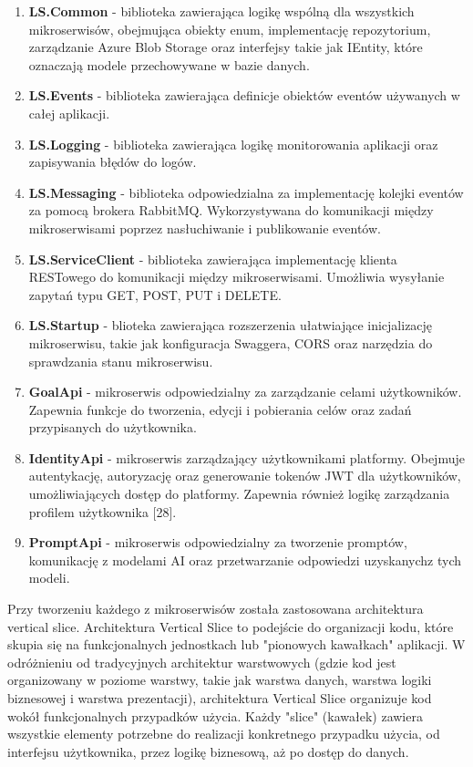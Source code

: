 \begin{enumerate}
\item {\bf LS.Common} - biblioteka zawierająca logikę wspólną dla wszystkich mikroserwisów, obejmująca obiekty enum, implementację repozytorium, zarządzanie Azure Blob Storage oraz interfejsy takie jak IEntity, które oznaczają modele przechowywane w bazie danych.
\item {\bf LS.Events} - biblioteka zawierająca definicje obiektów eventów używanych w całej aplikacji.
\item {\bf LS.Logging} - biblioteka zawierająca logikę monitorowania aplikacji oraz zapisywania błędów do logów.
\item {\bf LS.Messaging} - biblioteka odpowiedzialna za implementację kolejki eventów za pomocą brokera RabbitMQ. Wykorzystywana do komunikacji między mikroserwisami poprzez nasłuchiwanie i publikowanie eventów.
\item {\bf LS.ServiceClient} - biblioteka zawierająca implementację klienta RESTowego do komunikacji między mikroserwisami. Umożliwia wysyłanie zapytań typu GET, POST, PUT i DELETE.
\item {\bf LS.Startup} - blioteka zawierająca rozszerzenia ułatwiające inicjalizację mikroserwisu, takie jak konfiguracja Swaggera, CORS oraz narzędzia do sprawdzania stanu mikroserwisu.
\item {\bf GoalApi} - mikroserwis odpowiedzialny za zarządzanie celami użytkowników. Zapewnia funkcje do tworzenia, edycji i pobierania celów oraz zadań przypisanych do użytkownika.
\item {\bf IdentityApi} - mikroserwis zarządzający użytkownikami platformy. Obejmuje autentykację, autoryzację oraz generowanie tokenów JWT dla użytkowników, umożliwiających dostęp do platformy. Zapewnia również logikę zarządzania profilem użytkownika [28].
\item {\bf PromptApi} - mikroserwis odpowiedzialny za tworzenie promptów, komunikację z modelami AI oraz przetwarzanie odpowiedzi uzyskanych\linebreak z tych modeli.
\end{enumerate}

Przy tworzeniu każdego z mikroserwisów została zastosowana architektura vertical slice. Architektura Vertical Slice to podejście do organizacji kodu, które skupia się na funkcjonalnych jednostkach lub "pionowych kawałkach" aplikacji. W odróżnieniu od tradycyjnych architektur warstwowych (gdzie kod jest organizowany w poziome warstwy, takie jak warstwa danych, warstwa logiki biznesowej i warstwa prezentacji), architektura Vertical Slice organizuje kod wokół funkcjonalnych przypadków użycia. Każdy "slice" (kawałek) zawiera wszystkie elementy potrzebne do realizacji konkretnego przypadku użycia, od interfejsu użytkownika, przez logikę biznesową, aż po dostęp do danych.

